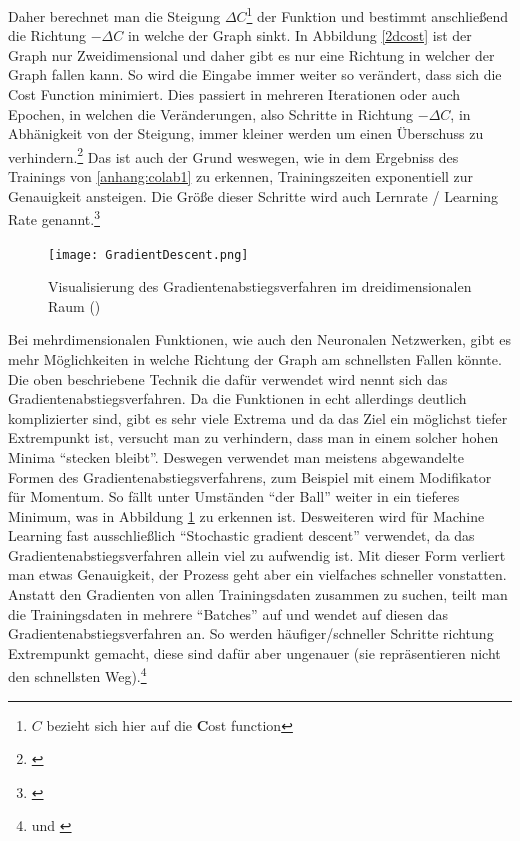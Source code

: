 Daher berechnet man die Steigung $\Delta C$\footnote{$C$ bezieht sich hier auf die \textbf{C}ost function} der Funktion und bestimmt anschließend die Richtung $-\Delta C$ in welche der Graph sinkt. In Abbildung \ref{2dcost} ist der Graph nur Zweidimensional und daher gibt es nur eine Richtung in welcher der Graph fallen kann. So wird die Eingabe immer weiter so verändert, dass sich die Cost Function minimiert. Dies passiert in mehreren Iterationen oder auch Epochen, in welchen die Veränderungen, also Schritte in Richtung $-\Delta C$, in Abhänigkeit von der Steigung, immer kleiner werden um einen Überschuss zu verhindern.\footnote{\cite{3blue1brown}} Das ist auch der Grund weswegen, wie in dem Ergebniss des Trainings von \ref{anhang:colab1} zu erkennen, Trainingszeiten exponentiell zur Genauigkeit ansteigen. Die Größe dieser Schritte wird auch Lernrate / Learning Rate genannt.\footnote{\cite{readthedocsgradientdescent}}


\begin{figure}
    \texttt{[image: GradientDescent.png]}
    \caption[3dcost]{Visualisierung des Gradientenabstiegsverfahren im dreidimensionalen Raum (\cite{3blue1brown})}
    \label{3dcost}
\end{figure}

Bei mehrdimensionalen Funktionen, wie auch den Neuronalen Netzwerken, gibt es mehr Möglichkeiten in welche Richtung der Graph am schnellsten Fallen könnte. Die oben beschriebene Technik die dafür verwendet wird nennt sich das Gradientenabstiegsverfahren. Da die Funktionen in echt allerdings deutlich komplizierter sind, gibt es sehr viele Extrema und da das Ziel ein möglichst tiefer Extrempunkt ist, versucht man zu verhindern, dass man in einem solcher hohen Minima "`stecken bleibt"'. Deswegen verwendet man meistens abgewandelte Formen des Gradientenabstiegsverfahrens, zum Beispiel mit einem Modifikator für Momentum. So fällt unter Umständen "`der Ball"' weiter in ein tieferes Minimum, was in Abbildung \ref{3dcost} zu erkennen ist. Desweiteren wird für Machine Learning fast ausschließlich "`Stochastic gradient descent"' verwendet, da das Gradientenabstiegsverfahren allein viel zu aufwendig ist. Mit dieser Form verliert man etwas Genauigkeit, der Prozess geht aber ein vielfaches schneller vonstatten. Anstatt den Gradienten von allen Trainingsdaten zusammen zu suchen, teilt man die Trainingsdaten in mehrere "`Batches"' auf und wendet auf diesen das Gradientenabstiegsverfahren an. So werden häufiger/schneller Schritte richtung Extrempunkt gemacht, diese sind dafür aber ungenauer (sie repräsentieren nicht den schnellsten Weg).\footnote{\cite{3blue1brown} und \cite{mitstochasticgd}}

